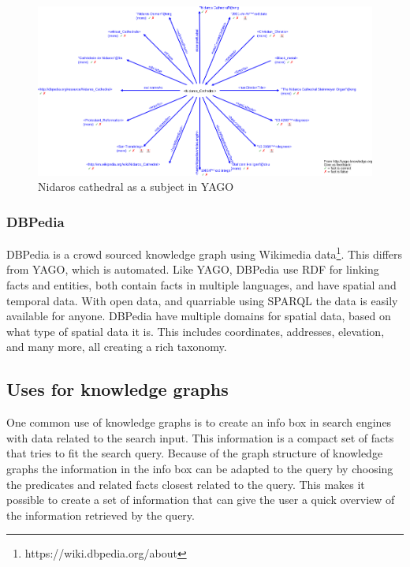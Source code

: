 \begin{figure}[t]
  \centering
  \includegraphics[scale=0.5]{figs/Nidaros_Cathedral.png}
  \caption[Nidaros cathedral as a subject in YAGO]{Nidaros cathedral as a subject in YAGO\protect\footnotemark}
  \label{fig:Nidaros}
\end{figure}

\subsubsection{DBPedia}
DBPedia is a crowd sourced knowledge graph using Wikimedia data\footnote{https://wiki.dbpedia.org/about}. This differs from YAGO, which is automated. Like YAGO, DBPedia use RDF for linking facts and entities, both contain facts in multiple languages, and have spatial and temporal data. With open data, and quarriable using SPARQL the data is easily available for anyone. DBPedia have multiple domains for spatial data, based on what type of spatial data it is. This includes coordinates, addresses, elevation, and many more, all creating a rich taxonomy.

\subsection{Uses for knowledge graphs}
One common use of knowledge graphs is to create an info box in search engines with data related to the search input. This information is a compact set of facts that tries to fit the search query. Because of the graph structure of knowledge graphs the information in the info box can be adapted to the query by choosing the predicates and related facts closest related to the query. This makes it possible to create a set of information that can give the user a quick overview of the information retrieved by the query.

